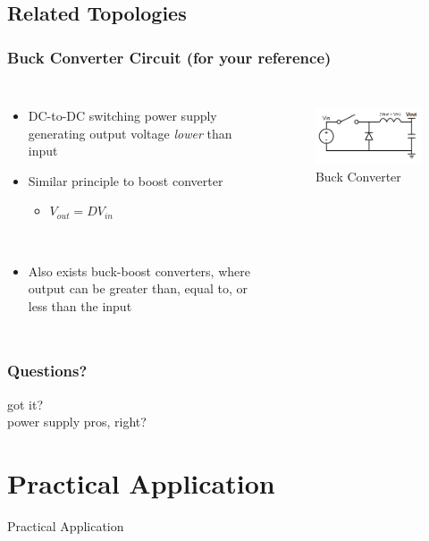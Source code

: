 \documentclass{beamer}
\begin{document}
\subsection{Related Topologies}

\begin{frame}
\frametitle{Buck Converter Circuit \small{(for your reference)}}
\begin{columns}[t]
\begin{itemize}
  \item DC-to-DC switching power supply generating output voltage \textit{lower} than input
  \item Similar principle to boost converter
  \begin{itemize}
    \item $V_{out}=D V_{in}$
  \end{itemize}
  \hfill \\
  \item Also exists buck-boost converters, where output can be greater than, equal to, or less than the input
\end{itemize}

\begin{figure}
  \centering
  \includegraphics[scale=0.33]{images-dis4/smps-buck} \\
  Buck Converter
\end{figure}
\end{columns}
\end{frame}

\begin{frame}
\frametitle{Questions?}
\centering
{\huge got it?} \\
\vspace{20px}
\tiny{power supply pros, right?}
\end{frame}

\section{Practical Application} %
\begin{frame}
\centering \huge Practical Application
\end{frame}
\end{document}
